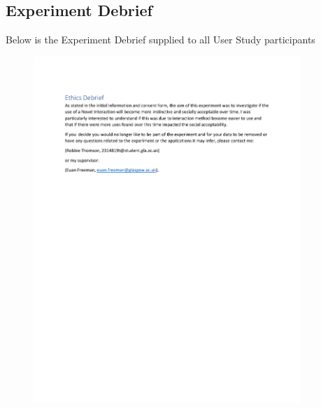 \documentclass{l4proj}
\begin{document}
\begin{appendices}
\chapter{Experiment Debrief}
Below is the Experiment Debrief supplied to all User Study participants
\begin{figure}[h!]
    \centering
    \includegraphics[width=0.9\textwidth]{images/Ethics Debrief.pdf}
\end{figure}



\end{appendices}
\end{document}
